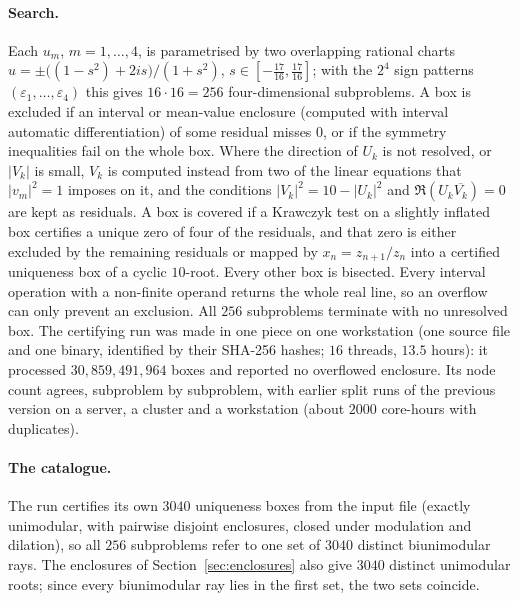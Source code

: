 \documentclass[11pt]{article}
\theoremstyle{definition}
\theoremstyle{remark}
\begin{document}
\paragraph{Search.} Each $u_m$, $m=1,\dots,4$, is parametrised by two overlapping rational charts
$u=\pm\bigl((1-s^2)+2is\bigr)/(1+s^2)$, $s\in[-\tfrac{17}{16},\tfrac{17}{16}]$; with the $2^4$ sign patterns
$(\varepsilon_1,\dots,\varepsilon_4)$ this gives $16\cdot16=256$ four-dimensional subproblems. A box is excluded if an interval or mean-value enclosure (computed with interval automatic
differentiation) of some residual misses $0$, or if the symmetry inequalities fail on the whole box. Where the
direction of $U_k$ is not resolved, or $|V_k|$ is small, $V_k$ is computed instead from two of the linear equations
that $|v_m|^2=1$ imposes on it, and the conditions $|V_k|^2=10-|U_k|^2$ and $\Re(U_k\overline{V_k})=0$ are kept as
residuals. A box is covered if a Krawczyk test on a slightly inflated box certifies a unique zero of four of the
residuals, and that zero is either excluded by the remaining residuals or mapped by $x_n=z_{n+1}/z_n$ into a certified
uniqueness box of a cyclic $10$-root. Every other box is bisected. Every interval operation with a non-finite operand
returns the whole real line, so an overflow can only prevent an exclusion. All $256$ subproblems terminate with no
unresolved box. The certifying run was made in one piece on one workstation (one source file and one binary,
identified by their SHA-256 hashes; $16$ threads, $13.5$ hours): it processed $30{,}859{,}491{,}964$ boxes and
reported no overflowed enclosure. Its node count agrees, subproblem by subproblem, with earlier split runs of the
previous version on a server, a cluster and a workstation (about $2000$ core-hours with duplicates).

\paragraph{The catalogue.} The run certifies its own $3040$ uniqueness boxes from the input file (exactly unimodular,
with pairwise disjoint enclosures, closed under modulation and dilation), so all $256$ subproblems refer to one set of
$3040$ distinct biunimodular rays. The enclosures of Section~\ref{sec:enclosures} also give $3040$ distinct
unimodular roots; since every biunimodular ray lies in the first set, the two sets coincide.
\end{document}
